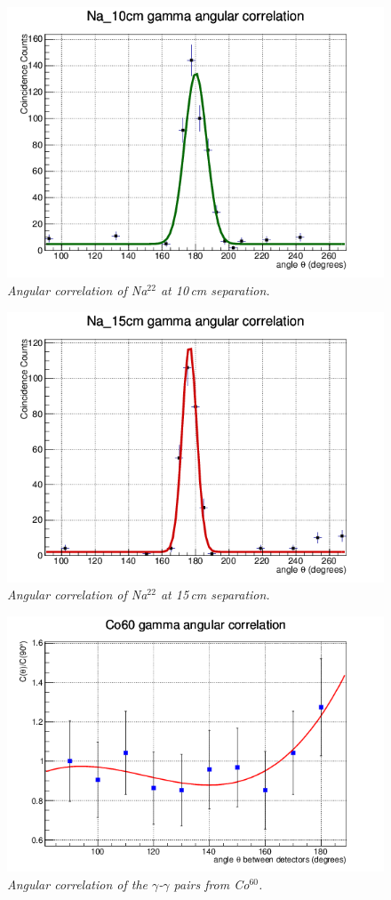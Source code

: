 \documentclass[aps,prl,twocolumn,superscriptaddress]{revtex4-1}
\begin{document}
\begin{figure}[h!]
  \begin{center}
\centerline{\includegraphics[width=3.in]{Na10.png}}
\caption{\it \small{Angular correlation of Na$^{22}$ at 10\,cm separation. \label{fig1}}}
  \end{center}
\end{figure}

\begin{figure}[h!]
  \begin{center}
\centerline{\includegraphics[width=3.in]{Na15.png}}
\caption{\it \small{Angular correlation of Na$^{22}$ at 15\,cm separation. \label{fig1}}}
  \end{center}
\end{figure}

\begin{figure}[h!]
  \begin{center}
\centerline{\includegraphics[width=3.in]{Co60.png}}
\caption{\it \small{Angular correlation of the $\gamma$-$\gamma$ pairs from Co$^{60}$. \label{fig1}}}
  \end{center}
\end{figure}
\end{document}
